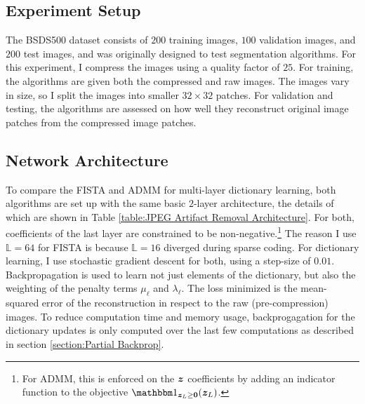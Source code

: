 \subsection{Experiment Setup}
The BSDS500 dataset consists of $200$ training images, $100$ validation images, and $200$ test images, and was originally designed to test segmentation algorithms. For this experiment, I compress the images using a quality factor of $25$. For training, the algorithms are given both the compressed and raw images. The images vary in size, so I split the images into smaller $32 \times 32$ patches. For validation and testing, the algorithms are assessed on how well they reconstruct original image patches from the compressed image patches.
\subsection{Network Architecture}
To compare the FISTA and ADMM for multi-layer dictionary learning, both algorithms are set up with the same basic $2$-layer architecture, the details of which are shown in Table \ref{table:JPEG Artifact Removal Architecture}. For both, coefficients of the last layer are constrained to be non-negative.\footnote{For ADMM, this is enforced on the $\bm{z}$ coefficients by adding an indicator function to the objective $\indicator_{\vz_L \geq \vzero}(\vz_L)$.}  The reason I use $\mathbb{L} = 64$ for FISTA is because $\mathbb{L} = 16$ diverged during sparse coding. For dictionary learning, I use stochastic gradient descent for both, using a step-size of $0.01$. Backpropagation is used to learn not just elements of the dictionary, but also the weighting of the penalty terms $\mu_{\ell}$ and $\lambda_{\ell}$. The loss minimized is the mean-squared error of the reconstruction in respect to the raw (pre-compression) images. To reduce computation time and memory usage, backprogagation for the dictionary updates is only computed over the last few computations as described in section \ref{section:Partial Backprop}.
